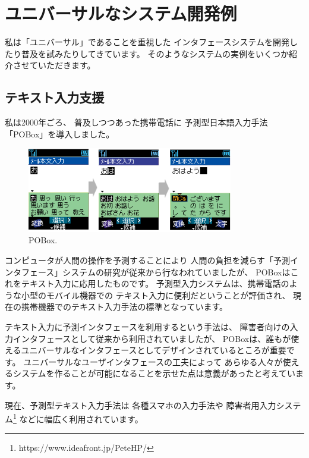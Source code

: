 \documentclass[topics]{compsoft} %
\begin{document}
 
\section{ユニバーサルなシステム開発例}

私は「ユニバーサル」であることを重視した
インタフェースシステムを開発したり普及を試みたりしてきています。
そのようなシステムの実例をいくつか紹介させていただきます。

\subsection{テキスト入力支援}

私は2000年ごろ、
普及しつつあった携帯電話に
予測型日本語入力手法「POBox」を導入しました。

\begin{figure}[h]
  \includegraphics[width=9cm,bb=0 0 404 600]{figures/ac2b347a7042f920edd576ee07c4b7f4.png}
  \caption{POBox.}
  \label{example1}
\end{figure}

コンピュータが人間の操作を予測することにより
人間の負担を減らす「予測インタフェース」システムの研究が従来から行なわれていましたが、
POBoxはこれをテキスト入力に応用したものです。
%
予測型入力システムは、携帯電話のような小型のモバイル機器での
テキスト入力に便利だということが評価され、
現在の携帯機器でのテキスト入力手法の標準となっています。

テキスト入力に予測インタフェースを利用するという手法は、
障害者向けの入力インタフェースとして従来から利用されていましたが、
POBoxは、誰もが使えるユニバーサルなインタフェースとしてデザインされているところが重要です。
ユニバーサルなユーザインタフェースの工夫によって
あらゆる人々が使えるシステムを作ることが可能になることを示せた点は意義があったと考えています。

現在、予測型テキスト入力手法は
各種スマホの入力手法や
障害者用入力システム\footnote{
  \textsf{https:{\slash}{\slash}www.ideafront.jp{\slash}PeteHP{\slash}}
}
などに幅広く利用されています。
\end{document}
